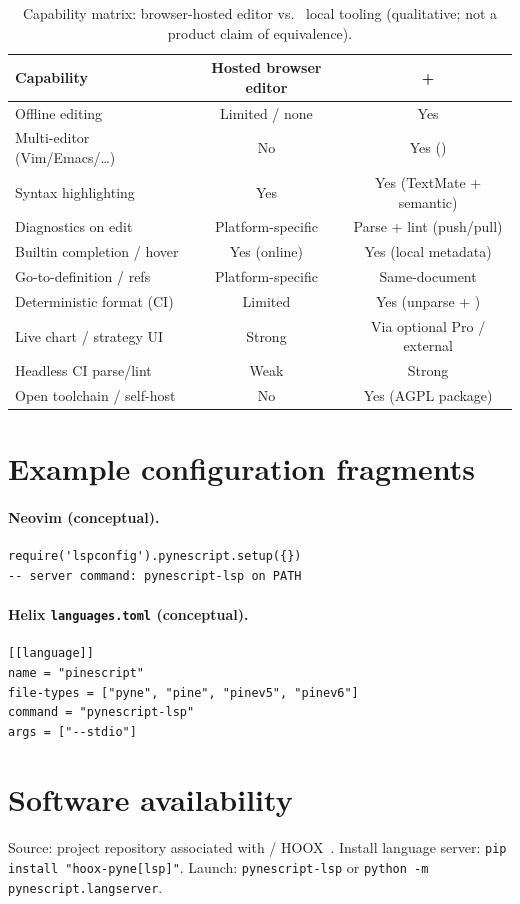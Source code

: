 \documentclass[11pt,a4paper]{article}
\begin{document}
\begin{table}[h]
\centering
\caption{Capability matrix: browser-hosted \tv{} editor vs.\ \pyne{} local tooling
(qualitative; not a product claim of equivalence).}
\label{tab:compare}
\small
\begin{tabular}{@{}p{3.6cm}cc@{}}
\toprule
Capability & Hosted browser editor & \pyne{} \lsp{} + \cli{} \\
\midrule
Offline editing & Limited / none & Yes \\
Multi-editor (Vim/Emacs/\ldots) & No & Yes (\lsp{}) \\
Syntax highlighting & Yes & Yes (TextMate + semantic) \\
Diagnostics on edit & Platform-specific & Parse + lint (push/pull) \\
Builtin completion / hover & Yes (online) & Yes (local metadata) \\
Go-to-definition / refs & Platform-specific & Same-document \\
Deterministic format (CI) & Limited & Yes (unparse + \cli{}) \\
Live chart / strategy UI & Strong & Via optional Pro \api{} / external \\
Headless CI parse/lint & Weak & Strong \\
Open toolchain / self-host & No & Yes (AGPL package) \\
\bottomrule
\end{tabular}
\end{table}

\section{Example configuration fragments}
\label{app:config}

\paragraph{Neovim (conceptual).}
\begin{lstlisting}[style=python,numbers=none,basicstyle=\ttfamily\scriptsize,language={}]
require('lspconfig').pynescript.setup({})
-- server command: pynescript-lsp on PATH
\end{lstlisting}

\paragraph{Helix \texttt{languages.toml} (conceptual).}
\begin{lstlisting}[style=python,numbers=none,basicstyle=\ttfamily\scriptsize,language={}]
[[language]]
name = "pinescript"
file-types = ["pyne", "pine", "pinev5", "pinev6"]
command = "pynescript-lsp"
args = ["--stdio"]
\end{lstlisting}

\section{Software availability}
\label{app:avail}

Source: project repository associated with \pyne{} / HOOX~\citep{pynescript2026,hoox2026}.
Install language server: \texttt{pip install "hoox-pyne[lsp]"}. Launch:
\texttt{pynescript-lsp} or \texttt{python -m pynescript.langserver}.
\end{document}
